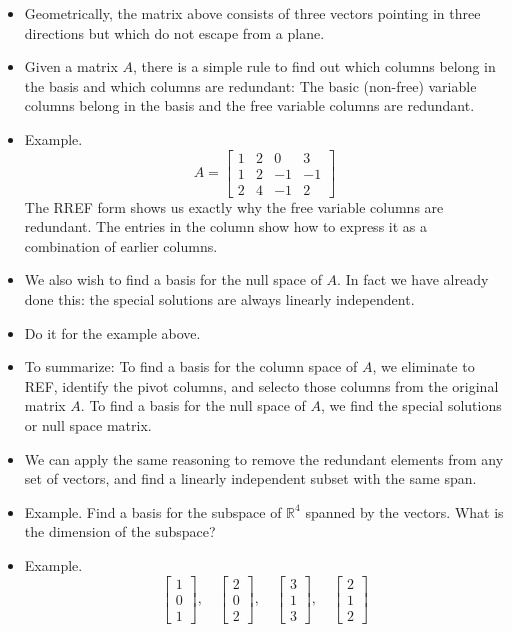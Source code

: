 \documentclass[11pt,oneside]{amsbook}
\newcommand{\RR}{\mathbb R}
\theoremstyle{definition}
\theoremstyle{plain}
\theoremstyle{definition}
\theoremstyle{remark}
\numberwithin{equation}{section}
\numberwithin{figure}{section}
\begin{document}
\begin{itemize}
\item Geometrically, the matrix above consists of three vectors pointing in three directions but which do not escape from a plane.
\item Given a matrix $A$, there is a simple rule to find out which columns belong in the basis and which columns are redundant: The basic (non-free) variable columns belong in the basis and the free variable columns are redundant.
\item Example.
  \[A=\begin{bmatrix}
      1&2&0&3\\1&2&-1&-1\\2&4&-1&2
    \end{bmatrix}
  \]
  The RREF form shows us exactly why the free variable columns are redundant. The entries in the column show how to express it as a combination of earlier columns.
\item We also wish to find a basis for the null space of $A$. In fact we have already done this: the special solutions are always linearly independent.
\item Do it for the example above.
\item To summarize: To find a basis for the column space of $A$, we eliminate to REF, identify the pivot columns, and selecto those columns from the original matrix $A$. To find a basis for the null space of $A$, we find the special solutions or null space matrix.
\item We can apply the same reasoning to remove the redundant elements from any set of vectors, and find a linearly independent subset with the same span.
\item Example. Find a basis for the subspace of $\RR^4$ spanned by the vectors. What is the dimension of the subspace?
\item Example.
  \[\begin{bmatrix}1\\0\\1\end{bmatrix},\quad
    \begin{bmatrix}2\\0\\2\end{bmatrix},\quad
    \begin{bmatrix}3\\1\\3\end{bmatrix},\quad
    \begin{bmatrix}2\\1\\2\end{bmatrix}
  \]
\end{itemize}
\end{document}
